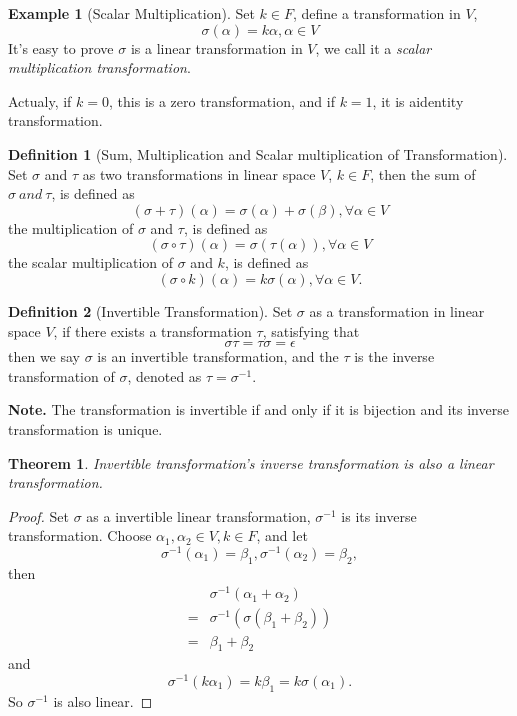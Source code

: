 \documentclass{article}
\newtheorem{theorem}{Theorem}[section]
\theoremstyle{definition}
\newtheorem{defi}{Definition}[section]
\newtheorem{example}{Example}[defi]
\begin{document}
\begin{example}[Scalar Multiplication]
    Set $k\in F$, define a transformation in $V$,
    $$\sigma (\alpha)=k \alpha, \alpha\in V$$
    It's easy to prove $\sigma$ is a linear transformation in $V$, 
    we call it a \textit{scalar multiplication transformation}.
\end{example}

Actualy, if $k=0$, this is a zero transformation, and if $k=1$, it is aidentity transformation.

\begin{defi}[Sum, Multiplication and Scalar multiplication of Transformation]
    Set $\sigma$ and $\tau$ as two transformations in linear space $V$, 
    $k\in F$, then the sum of $\sigma\ and\ \tau$, is defined as 
    $$(\sigma+\tau)(\alpha)=\sigma(\alpha)+\sigma(\beta),\forall \alpha\in V$$
    the multiplication of $\sigma$ and $\tau$, is defined as 
    $$(\sigma\circ\tau)(\alpha)=\sigma(\tau(\alpha)),\forall \alpha\in V$$
    the scalar multiplication of $\sigma$ and $k$, is defined as
    $$(\sigma\circ k)(\alpha)=k\sigma(\alpha),\forall \alpha\in V.$$
\end{defi}

\begin{defi}[Invertible Transformation]
    Set $\sigma$ as a transformation in linear space $V$, 
    if there exists a transformation $\tau$, satisfying that 
    $$\sigma \tau=\tau\sigma=\epsilon$$
    then we say $\sigma$ is an invertible transformation, and the 
    $\tau$ is the inverse transformation of $\sigma$, denoted as $\tau=\sigma^{-1}.$
\end{defi}

\textbf{Note.} The transformation is invertible if and only if it is bijection and its inverse 
transformation is unique.

\begin{theorem}
    Invertible transformation's inverse transformation is also a linear transformation.
\end{theorem}
\begin{proof}
    Set $\sigma$ as a invertible linear transformation, $\sigma^{-1}$ is its inverse transformation.
    Choose $\alpha_{1},\alpha_{2}\in V,k\in F$, and let
    $$\sigma^{-1}(\alpha_{1})=\beta_{1},\sigma^{-1}(\alpha_{2})=\beta_{2},$$
    then 
    \begin{align*}
        & \sigma^{-1}(\alpha_{1}+\alpha_{2})\\
         = &\sigma^{-1}(\sigma(\beta_{1}+\beta_{2}))\\
         = &\beta_{1}+\beta_{2}
    \end{align*}
    and
    $$\sigma^{-1}(k\alpha_{1})=k\beta_{1}=k\sigma(\alpha_{1}).$$
    So $\sigma^{-1}$ is also linear.
\end{proof}
\end{document}
